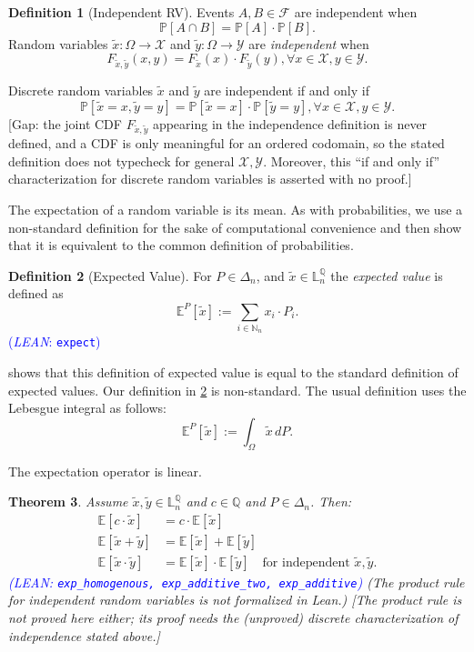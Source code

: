 \documentclass[letterpaper]{article}
\theoremstyle{plain}
\newtheorem{theorem}{Theorem}[subsection]
\theoremstyle{definition}
\newtheorem{definition}[theorem]{Definition}
\theoremstyle{remark}
\newcommand{\Nats}{\mathbb{N}}
\newcommand{\E}{\mathbb{E}}
\newcommand{\PP}{\mathbb{P}}
\newcommand{\cc}[1]{\textcolor{ccolor}{[#1]}}
\newcommand{\lean}[1]{\textcolor{blue}{(\emph{LEAN}: \texttt{#1})}}
\newcommand{\leanok}{}
\begin{document}
\begin{definition}[Independent RV]
  Events $A,B \in \mathcal{F}$ are independent when
  \[
   \PP[ A \cap B ] = \PP[ A ] \cdot \PP[ B ].
  \]
  Random variables $\tilde{x}\colon \Omega \to \mathcal{X}$ and $\tilde{y}\colon \Omega \to \mathcal{Y}$ are \emph{independent} when
  \[
    F_{\tilde{x}, \tilde{y}}(x,y) = F_{\tilde{x}}(x) \cdot F_{\tilde{y}}(y),
    \forall x\in \mathcal{X}, y\in \mathcal{Y}.
  \]
\end{definition}
Discrete random variables $\tilde{x}$ and $\tilde{y}$ are independent if and only if
\[
  \PP\left[\tilde{x} = x, \tilde{y} = y\right] = \PP\left[\tilde{x} = x\right] \cdot \PP\left[\tilde{y} = y\right], \forall x\in \mathcal{X}, y\in \mathcal{Y}.
\]
\cc{Gap: the joint CDF $F_{\tilde{x},\tilde{y}}$ appearing in the independence definition is never defined, and a CDF is only meaningful for an ordered codomain, so the stated definition does not typecheck for general $\mathcal{X},\mathcal{Y}$. Moreover, this ``if and only if'' characterization for discrete random variables is asserted with no proof.}


The expectation of a random variable is its mean. As with probabilities, we use a non-standard definition for the sake of computational convenience and then show that it is equivalent to the common definition of probabilities. 
\begin{definition}[Expected Value] \label{def:expectation}
For $P \in \Delta_n$, and $\tilde{x}\in \mathbb{L}_n^{\mathbb{Q}}$ the \emph{expected value} is defined as
\[
 \E^P\left[\tilde{x}\right] := \sum_{i \in \Nats_n }  x_i \cdot P_i.
\]
\lean{expect} \leanok
\end{definition}

 shows that this definition of expected value is equal to the standard definition of expected values.
Our definition in \cref{def:expectation} is non-standard. The usual definition uses the Lebesgue integral as follows:
\[
 \E^P\left[\tilde{x}\right] := \int_{\Omega} \tilde{x} \, dP.
\]



The expectation operator is linear.
\begin{theorem} \label{thm:exp-linear}
  Assume $\tilde{x},\tilde{y} \in \mathbb{L}_n^{\mathbb{Q}}$ and $c\in \mathbb{Q} $ and $P\in \Delta_n$. Then:
  \begin{align*}
    \E\left[c\cdot \tilde{x}\right] &= c \cdot  \E\left[\tilde{x}\right]\\
    \E\left[\tilde{x} + \tilde{y}\right] &= \E\left[\tilde{x}\right] + \E\left[\tilde{y}\right]\\
    \E\left[\tilde{x} \cdot \tilde{y}\right] &= \E\left[\tilde{x}\right] \cdot \E\left[\tilde{y}\right] \quad \text{for independent } \tilde{x}, \tilde{y}.
\end{align*}
\lean{exp\_homogenous, exp\_additive\_two, exp\_additive}
(The product rule for independent random variables is not formalized in Lean.)
\cc{The product rule is not proved here either; its proof needs the (unproved) discrete characterization of independence stated above.}
\end{theorem}
\end{document}
